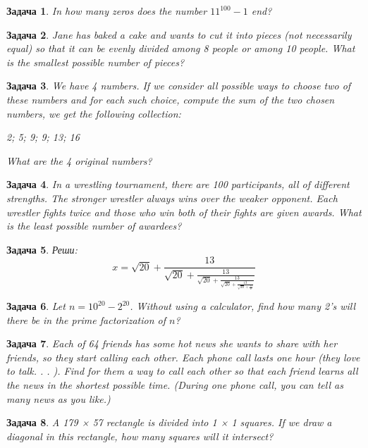 \documentclass[12pt]{article}
\theoremstyle{break}
\newtheorem{problem}{Задача}[subsection]
\begin{document}
\begin{problem}
In how many zeros does the number $11^{100} - 1$ end?
\end{problem}


\begin{problem}
Jane has baked a cake and wants to cut it into pieces (not necessarily equal) so that it can be evenly divided among 8 people or among 10 people. What is the smallest possible number of pieces?
\end{problem}


\begin{problem}
We have 4 numbers. If we consider all possible ways to choose two of these numbers and for each such choice, compute the sum of the two chosen numbers, we get the following collection:

2; 5; 9; 9; 13; 16

\noindent
What are the 4 original numbers?
\end{problem}


\begin{problem}
In a wrestling tournament, there are 100 participants, all of different strengths. The stronger wrestler always wins over the weaker opponent. Each wrestler fights twice and those who win both of their fights are given awards. What is the least possible number of awardees?
\end{problem}


\begin{problem}
Реши:
\[
	x=\sqrt{20}+\frac{13}{\sqrt{20}+\frac{13}{\sqrt{20}+\frac{13}{\sqrt{20}+\frac{13}{\sqrt{20}+\frac{13}{x}}}}}
\]
\end{problem}


\begin{problem}
Let $n = 10^{20} − 2^{20}$. Without using a calculator, find how many 2’s will there be in the prime factorization of $n$?
\end{problem}


\begin{problem}
Each of 64 friends has some hot news she wants to share with her friends, so they start calling each other. Each phone call lasts one hour (they love to talk. . . ). Find for them a way to call each other so that each friend learns all the news in the shortest possible time. (During one phone call, you can tell as many news as you like.)
\end{problem}


\begin{problem}
A 179 × 57 rectangle is divided into 1 × 1 squares. If we draw a diagonal in this rectangle, how many squares will it intersect?
\end{problem}
\end{document}

